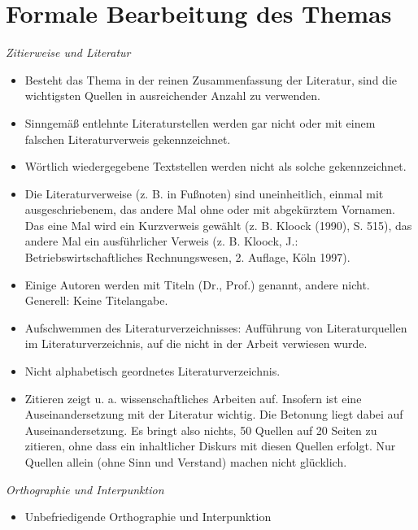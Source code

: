 \chapter{Formale Bearbeitung des Themas}

\emph{Zitierweise und Literatur}
\begin{itemize}
    \item Besteht das Thema in der reinen Zusammenfassung der Literatur, sind die wichtigsten Quellen in ausreichender Anzahl zu verwenden.
    \item Sinngemäß entlehnte Literaturstellen werden gar nicht oder mit einem falschen Literaturverweis gekennzeichnet.
    \item Wörtlich wiedergegebene Textstellen werden nicht als solche gekennzeichnet.
    \item Die Literaturverweise (z. B. in Fußnoten) sind uneinheitlich, einmal mit ausgeschriebenem, das andere Mal ohne oder mit abgekürztem Vornamen. Das eine Mal wird ein Kurzverweis gewählt (z. B. Kloock (1990), S. 515), das andere Mal ein ausführlicher Verweis (z. B. Kloock, J.: Betriebswirtschaftliches Rechnungswesen, 2. Auflage, Köln 1997).
    \item Einige Autoren werden mit Titeln (Dr., Prof.) genannt, andere nicht. Generell: Keine Titelangabe.
    \item Aufschwemmen des Literaturverzeichnisses: Aufführung von Literaturquellen im Literaturverzeichnis, auf die nicht in der Arbeit verwiesen wurde.
    \item Nicht alphabetisch geordnetes Literaturverzeichnis.
    \item Zitieren zeigt u. a. wissenschaftliches Arbeiten auf. Insofern ist eine Auseinandersetzung mit der Literatur wichtig. Die Betonung liegt dabei auf Auseinandersetzung. Es bringt also nichts, 50 Quellen auf 20 Seiten zu zitieren, ohne dass ein inhaltlicher Diskurs mit diesen Quellen erfolgt. Nur Quellen allein (ohne Sinn und Verstand) machen nicht glücklich.
\end{itemize}

\emph{Orthographie und Interpunktion}
\begin{itemize}
    \item Unbefriedigende Orthographie und Interpunktion
\end{itemize}


